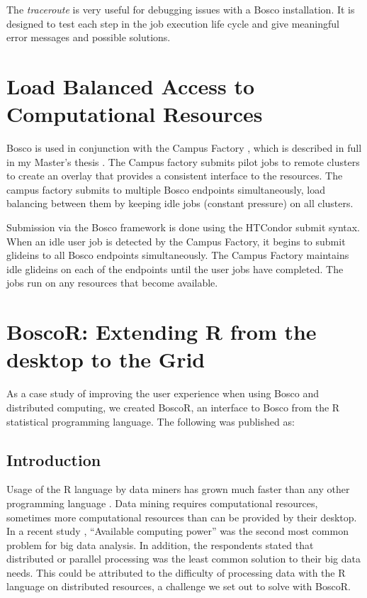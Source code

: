 The \emph{traceroute} is very useful for debugging issues with a Bosco installation.  It is designed to test each step in the job execution life cycle and give meaningful error messages and possible solutions.

\section{Load Balanced Access to Computational Resources}

Bosco is used in conjunction with the Campus Factory \cite{website:campusfactory}, which is described in full in my Master's thesis \cite{weitzel2011campus}.  The Campus factory submits pilot jobs to remote clusters to create an overlay that provides a consistent interface to the resources.  The campus factory submits to multiple Bosco endpoints simultaneously, load balancing between them by keeping idle jobs (constant pressure) on all clusters.

Submission via the Bosco framework is done using the HTCondor submit syntax.  When an idle user job is detected by the Campus Factory, it begins to submit glideins to all Bosco endpoints simultaneously.  The Campus Factory maintains idle glideins on each of the endpoints until the user jobs have completed.  The jobs run on any resources that become available.


\section{BoscoR: Extending R from the desktop to the Grid}

As a case study of improving the user experience when using Bosco and distributed computing, we created BoscoR, an interface to Bosco from the R statistical programming language.  The following was published as:


\subsection{Introduction}
Usage of the R language \cite{team2012r} by data miners has grown much faster than any other programming language \cite{rexer2013, KDnuggets2013}.  Data mining requires computational resources, sometimes more computational resources than can be provided by their desktop.  In a recent study \cite{rexer2013}, ``Available computing power'' was the second most common problem for big data analysis.  In addition, the respondents stated that distributed or parallel processing was the least common solution to their big data needs.  This could be attributed to the difficulty of processing data with the R language on distributed resources, a challenge we set out to solve with BoscoR.

